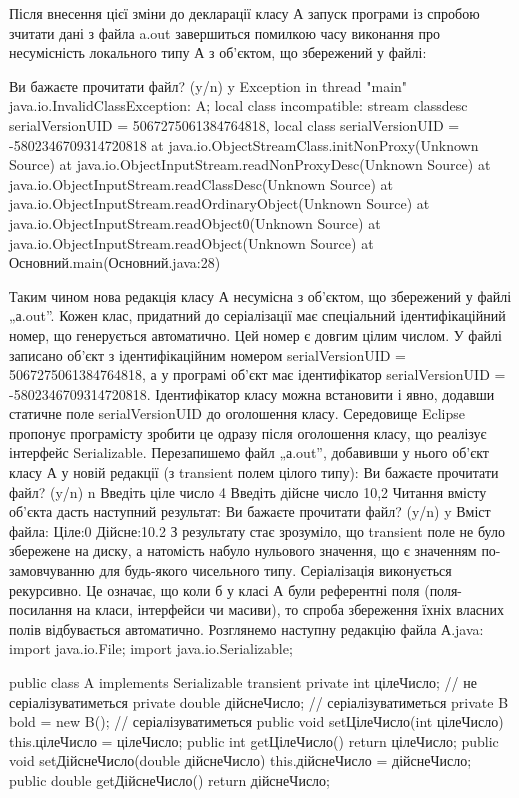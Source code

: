 Після внесення цієї зміни до декларації класу А запуск програми із спробою зчитати дані з файла a.out завершиться помилкою часу виконання про несумісність локального типу А з об’єктом, що збережений у файлі:

Ви бажаєте прочитати файл? (y/n) 
y
Exception in thread "main" java.io.InvalidClassException: A; local class incompatible: stream classdesc serialVersionUID = 5067275061384764818, local class serialVersionUID = -5802346709314720818
	at java.io.ObjectStreamClass.initNonProxy(Unknown Source)
	at java.io.ObjectInputStream.readNonProxyDesc(Unknown Source)
	at java.io.ObjectInputStream.readClassDesc(Unknown Source)
	at java.io.ObjectInputStream.readOrdinaryObject(Unknown Source)
	at java.io.ObjectInputStream.readObject0(Unknown Source)
	at java.io.ObjectInputStream.readObject(Unknown Source)
	at Основний.main(Основний.java:28)

Таким чином нова редакція класу А несумісна з об’єктом, що збережений у файлі „а.out”. Кожен клас, придатний до серіалізації має спеціальний ідентифікаційний номер, що генерується автоматично. Цей номер є довгим цілим числом. У файлі записано об’єкт з ідентифікаційним номером serialVersionUID = 5067275061384764818,  а у програмі об’єкт має ідентифікатор serialVersionUID = -5802346709314720818. Ідентифікатор класу можна встановити і явно, додавши статичне поле serialVersionUID до оголошення класу. Середовище Eclipse пропонує програмісту зробити це одразу після оголошення класу, що реалізує інтерфейс Serializable.
Перезапишемо файл „а.out”, добавивши у нього об’єкт класу А у новій редакції (з transient полем цілого типу):
Ви бажаєте прочитати файл? (y/n) 
n
Введіть ціле число
4
Введіть дійсне число
10,2
Читання вмісту об’єкта дасть наступний результат:
Ви бажаєте прочитати файл? (y/n) 
y
Вміст файла:
Ціле:0
Дійсне:10.2
З результату стає зрозуміло, що transient поле не було збережене на диску, а натомість набуло нульового значення, що є значенням по-замовчуванню для будь-якого чисельного типу.
Серіалізація виконується рекурсивно. Це означає, що коли б у класі А були референтні поля (поля-посилання на класи, інтерфейси чи масиви), то спроба збереження їхніх власних полів відбувається автоматично.
Розглянемо наступну редакцію файла А.java:
import java.io.File;
import java.io.Serializable;


public class A implements Serializable{
	transient private int цілеЧисло; // не серіалізуватиметься
	private double дійснеЧисло; // серіалізуватиметься
	private B bold = new B(); // серіалізуватиметься
	public void setЦілеЧисло(int цілеЧисло) {
		this.цілеЧисло = цілеЧисло;
	}
	public int getЦілеЧисло() {
		return цілеЧисло;
	}
	public void setДійснеЧисло(double дійснеЧисло) {
		this.дійснеЧисло = дійснеЧисло;
	}
	public double getДійснеЧисло() {
		return дійснеЧисло;
	}
}

